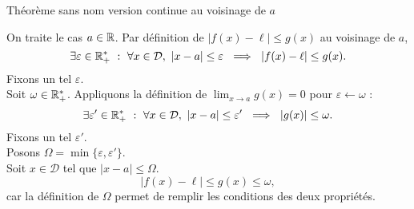 \documentclass{article}
\begin{document}
	\begin{question_kholle}
	    {Théorème sans nom version continue au voisinage de $a$}
	
	    On traite le cas $a\in \mathbb R$. Par définition de $|f(x) - \ell| \leq g(x)$ au voisinage de $a$, 
	    \[
	    	\exists \varepsilon \in \R _+ ^* \ : \ \forall x \in \mathcal{D}, \ |x-a| \leq \varepsilon \ \implies \ |f(x) - \ell| \leq g(x).
	    \]
	    Fixons un tel $\varepsilon$. \\
	    Soit $\omega \in \mathbb R_+ ^*$. Appliquons la définition de $\lim_{x \to a} g(x) = 0$ pour $\varepsilon \gets \omega$ :
	    \[
	   		\exists \varepsilon' \in \R_+ ^* \ : \ \forall x \in \mathcal{D}, \ |x-a| \leq \varepsilon' \ \implies \ |g(x)| \leq \omega.
	    \]
	    Fixons un tel $\varepsilon'$. \\
	    Posons $\Omega = \min{ \{\varepsilon,  \varepsilon' \} }$. \\
	    Soit $x\in \mathcal{D}$ tel que $|x-a| \leq \Omega$.
	    \[
		    |f(x) - \ell | \leq g(x) \leq \omega, 
	    \]
	    car la définition de $\Omega$ permet de remplir les conditions des deux propriétés.
	\end{question_kholle}
\end{document}
